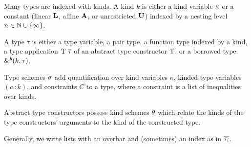 Many types are indexed with kinds.
A kind $k$ is either a kind variable $\kvar$ or a constant
(linear $\klin$, affine $\kaff$, or unrestricted $\kun$) indexed
by a nesting level $n \in \Nat \cup \{\infty\}$.

A type $\tau$ is either a type variable, a pair type, a function type indexed by a
kind,
a type application $\tapp{\tcon}{\Multi{\tau}}$ of an abstract type constructor
$\T T$, or a borrowed type  $\borrowty{k}{\tau}$.

Type schemes $\schm$ add quantification over kind
variables $\kappa$, kinded type variables $(\alpha:k)$, and constraints
$C$ to a type, where a constraint is a list of inequalities over
kinds.

Abstract type constructors possess kind schemes $\kschm$ which relate
the kinds of the type constructors' arguments to the kind of the
constructed type.

Generally, we write lists with an overbar and (sometimes) an index as
in $\Multi[i]\tau$.





